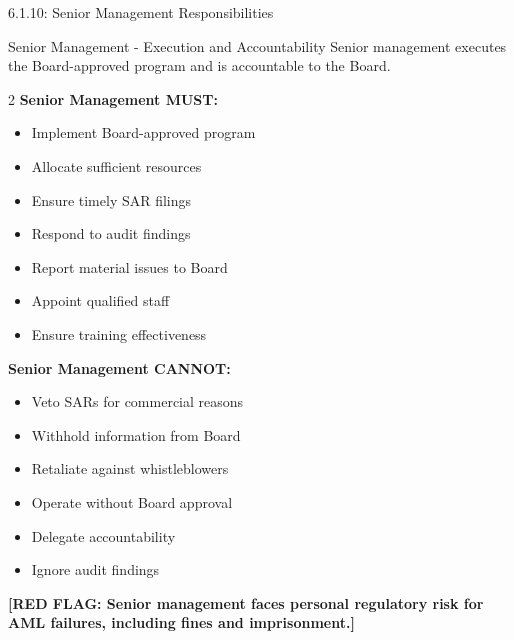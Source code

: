 \documentclass[11pt,a4paper]{beamer}
\newcommand{\redflag}[1]{\textcolor{red!80!black}{\textbf{[RED FLAG: #1]}}}
\begin{document}
\begin{frame}{6.1.10: Senior Management Responsibilities}
	\begin{block}{Senior Management - Execution and Accountability}
		Senior management executes the Board-approved program and is accountable to the Board.
	\end{block}
	\begin{multicols}{2}
		\textbf{Senior Management MUST:}
		\begin{itemize}
			\item Implement Board-approved program
			\item Allocate sufficient resources
			\item Ensure timely SAR filings
			\item Respond to audit findings
			\item Report material issues to Board
			\item Appoint qualified staff
			\item Ensure training effectiveness
		\end{itemize}
		\columnbreak
		\textbf{Senior Management CANNOT:}
		\begin{itemize}
			\item Veto SARs for commercial reasons
			\item Withhold information from Board
			\item Retaliate against whistleblowers
			\item Operate without Board approval
			\item Delegate accountability
			\item Ignore audit findings
		\end{itemize}
	\end{multicols}
	\redflag{Senior management faces personal regulatory risk for AML failures, including fines and imprisonment.}
\end{frame}

\end{document}
